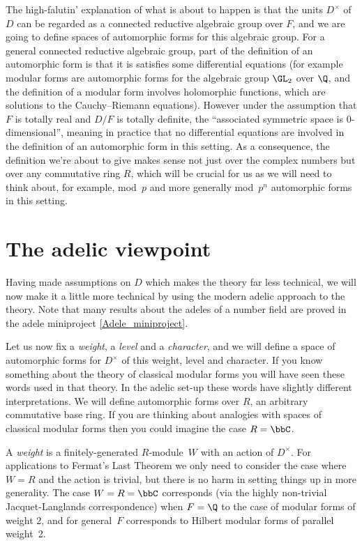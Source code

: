 The high-falutin' explanation of what is about to happen is that the units $D^\times$ of $D$
can be regarded as a connected reductive algebraic group over $F$, and we are going to define spaces
of automorphic forms for this algebraic group. For a general connected reductive algebraic group,
part of the definition of an automorphic form is that it is satisfies some differential
equations (for example modular forms are automorphic forms for the algebraic group $\GL_2$ over
$\Q$, and the definition of a modular form involves holomorphic functions, which are solutions to
the Cauchy--Riemann equations). However under the assumption that $F$ is totally real and $D/F$ is
totally definite, the ``associated symmetric space is 0-dimensional'', meaning in practice that
no differential equations are involved in the definition
of an automorphic form in this setting. As a consequence, the definition we're about to give
makes sense not just over the complex numbers but over any commutative ring $R$, which will
be crucial for us as we will need to think about, for example, mod~$p$ and more generally
mod~$p^n$ automorphic forms in this setting.

\section{The adelic viewpoint}

Having made assumptions on $D$ which makes the theory far less technical, we will now
make it a little more technical by using the modern adelic approach to the theory.
Note that many results about the adeles of a number field are proved in the adele
miniproject \ref{Adele_miniproject}.

Let us now fix a \emph{weight}, a \emph{level} and a \emph{character}, and we will define
a space of automorphic forms for $D^\times$ of this weight, level and character. If you know
something about the theory of classical modular forms you will have seen these words used in that
theory. In the adelic set-up these words have slightly different interpretations. We will define
automorphic forms over $R$, an arbitrary commutative base ring. If you are thinking about analogies
with spaces of classical modular forms then you could imagine the case $R=\bbC$.

A \emph{weight} is a finitely-generated $R$-module~$W$ with an action of $D^\times$. For applications
to Fermat's Last Theorem we only need to consider the case where $W=R$ and the action is trivial,
but there is no harm in setting things up in more generality. The case $W=R=\bbC$ corresponds (via
the highly non-trivial Jacquet-Langlands correspondence) when $F=\Q$ to the case of modular forms
of weight 2, and for general~$F$ corresponds to Hilbert modular forms of parallel weight~2.

